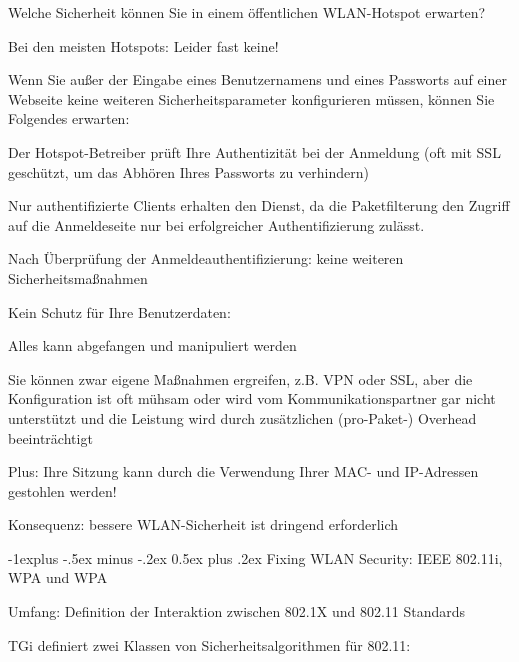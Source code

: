 \documentclass[a4paper]{article}
\makeatletter
\renewcommand{\subsection}{\@startsection{subsection}{2}{0mm}%
 {-1explus -.5ex minus -.2ex}%
 {0.5ex plus .2ex}%
 {\normalfont\normalsize\bfseries}}
\makeatother
\begin{document}
\begin{multicols}{3}
      Welche Sicherheit können Sie in einem öffentlichen WLAN-Hotspot
      erwarten?

      \begin{itemize*}
            \item
            Bei den meisten Hotspots: Leider fast keine!
            \item
            Wenn Sie außer der Eingabe eines Benutzernamens und eines Passworts
            auf einer Webseite keine weiteren Sicherheitsparameter konfigurieren
            müssen, können Sie Folgendes erwarten:

            \begin{itemize*}
                  \item Der Hotspot-Betreiber prüft Ihre Authentizität bei der Anmeldung (oft mit SSL geschützt, um das Abhören Ihres Passworts zu verhindern)
                  \item Nur authentifizierte Clients erhalten den Dienst, da die Paketfilterung den Zugriff auf die Anmeldeseite nur bei erfolgreicher Authentifizierung zulässt.
                  \item Nach Überprüfung der Anmeldeauthentifizierung: keine weiteren Sicherheitsmaßnahmen
                  \item Kein Schutz für Ihre Benutzerdaten:
                  \begin{itemize*} \item Alles kann abgefangen und manipuliert werden \item Sie können zwar eigene Maßnahmen ergreifen, z.B. VPN oder SSL, aber die Konfiguration ist oft mühsam oder wird vom Kommunikationspartner gar nicht unterstützt und die Leistung wird durch zusätzlichen (pro-Paket-) Overhead beeinträchtigt \end{itemize*}
                  \item Plus: Ihre Sitzung kann durch die Verwendung Ihrer MAC- und IP-Adressen gestohlen werden!
            \end{itemize*}
            \item
            Konsequenz: bessere WLAN-Sicherheit ist dringend erforderlich
      \end{itemize*}


      \subsection{Fixing WLAN Security: IEEE 802.11i, WPA und
            WPA}

      \begin{itemize*}
            \item
            Umfang: Definition der Interaktion zwischen 802.1X und 802.11
            Standards
            \item
            TGi definiert zwei Klassen von Sicherheitsalgorithmen für 802.11:


\end{itemize*}
\end{multicols}
\end{document}
